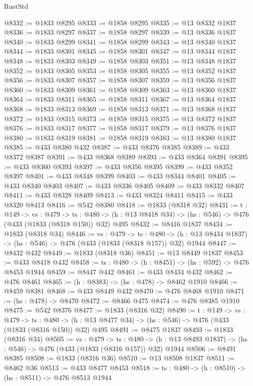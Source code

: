 \begin{lexlean}{RustStd}
\begin{coremodule}
@8332 := @1833 @8295
@8333 := @1858 @8295
@8335 := @13 @8332 @1837
@8336 := @1833 @8297
@8337 := @1858 @8297
@8339 := @13 @8336 @1837
@8340 := @1833 @8299
@8341 := @1858 @8299
@8343 := @13 @8340 @1837
@8344 := @1833 @8301
@8345 := @1858 @8301
@8347 := @13 @8344 @1837
@8348 := @1833 @8303
@8349 := @1858 @8303
@8351 := @13 @8348 @1837
@8352 := @1833 @8305
@8353 := @1858 @8305
@8355 := @13 @8352 @1837
@8356 := @1833 @8307
@8357 := @1858 @8307
@8359 := @13 @8356 @1837
@8360 := @1833 @8309
@8361 := @1858 @8309
@8363 := @13 @8360 @1837
@8364 := @1833 @8311
@8365 := @1858 @8311
@8367 := @13 @8364 @1837
@8368 := @1833 @8313
@8369 := @1858 @8313
@8371 := @13 @8368 @1837
@8372 := @1833 @8315
@8373 := @1858 @8315
@8375 := @13 @8372 @1837
@8376 := @1833 @8317
@8377 := @1858 @8317
@8379 := @13 @8376 @1837
@8380 := @1833 @8319
@8381 := @1858 @8319
@8383 := @13 @8380 @1837
@8385 := @433 @8380 @432
@8387 := @433 @8376 @8385
@8389 := @433 @8372 @8387
@8391 := @433 @8368 @8389
@8393 := @433 @8364 @8391
@8395 := @433 @8360 @8393
@8397 := @433 @8356 @8395
@8399 := @433 @8352 @8397
@8401 := @433 @8348 @8399
@8403 := @433 @8344 @8401
@8405 := @433 @8340 @8403
@8407 := @433 @8336 @8405
@8409 := @433 @8332 @8407
@8411 := @433 @8328 @8409
@8413 := @433 @8324 @8411
@8415 := @433 @8320 @8413
@8416 := @542 @8380
@8418 := @1833 (@8318 @32)
@8431 := {t : @149} ->
  {vs : @479} ->
  {ts : @480} -> (h : @13 @8418 @34) -> (hs : @546) -> @476 (@433 (@1833 (@8318 @150)) @32) @495
@8432 := @8416 @1837
@8434 := @1833 (@8318 @34)
@8446 := {vs : @479} ->
  {ts : @480} -> (h : @13 @8434 @1837) -> (hs : @546) -> @476 (@433 (@1833 (@8318 @157)) @32) @1944
@8447 := @8432 @432
@8449 := @1833 (@8318 @36)
@8451 := @13 @8449 @1837
@8453 := @433 @8418 @432
@8458 := {ts : @480} -> (h : @8451) -> (hs : @592) -> @476 @8453 @1944
@8459 := @8447 @442
@8461 := @433 @8434 @432
@8462 := @476 @8461
@8465 := (h : @8383) -> (hs : @478) -> @8462 @1910
@8466 := @8459 @8381
@8468 := @433 @8449 @432
@8470 := @476 @8468 @1910
@8471 := (hs : @478) -> @8470
@8472 := @8466 @475
@8474 := @476 @8385 @1910
@8475 := @542 @8376
@8477 := @1833 (@8316 @32)
@8490 := {t : @149} ->
  {vs : @479} ->
  {ts : @480} -> (h : @13 @8477 @34) -> (hs : @546) -> @476 (@433 (@1833 (@8316 @150)) @32) @495
@8491 := @8475 @1837
@8493 := @1833 (@8316 @34)
@8505 := {vs : @479} ->
  {ts : @480} -> (h : @13 @8493 @1837) -> (hs : @546) -> @476 (@433 (@1833 (@8316 @157)) @32) @1944
@8506 := @8491 @8385
@8508 := @1833 (@8316 @36)
@8510 := @13 @8508 @1837
@8511 := @8462 @36
@8513 := @433 @8477 @8453
@8518 := {ts : @480} -> (h : @8510) -> (hs : @8511) -> @476 @8513 @1944

\end{coremodule}
\end{lexlean}
